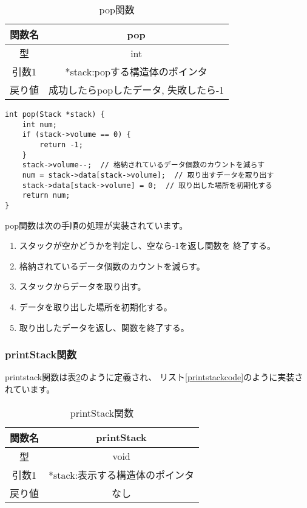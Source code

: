 \documentclass[a4j]{jarticle}
\begin{document}
\begin{table}[h]
  \centering
  \caption{pop関数}
  \label{tb:pop}
  \begin{tabular}{|c|c|}
    \hline
    関数名 & pop                    \\
    \hline
    型   & int                    \\
    \hline
    引数1 & *stack:popする構造体のポインタ   \\
    \hline
    戻り値 & 成功したらpopしたデータ, 失敗したら-1 \\
    \hline
  \end{tabular}
\end{table}

\begin{lstlisting}[caption=pop関数,label=popcode]
  int pop(Stack *stack) {
    int num;
    if (stack->volume == 0) {
        return -1;
    }
    stack->volume--;  // 格納されているデータ個数のカウントを減らす
    num = stack->data[stack->volume];  // 取り出すデータを取り出す
    stack->data[stack->volume] = 0;  // 取り出した場所を初期化する
    return num;
}
  \end{lstlisting}

pop関数は次の手順の処理が実装されています。
\begin{enumerate}
  \item スタックが空かどうかを判定し、空なら-1を返し関数を
        終了する。
  \item 格納されているデータ個数のカウントを減らす。
  \item スタックからデータを取り出す。
  \item データを取り出した場所を初期化する。
  \item 取り出したデータを返し、関数を終了する。
\end{enumerate}

\subsubsection{printStack関数}
\label{sec:printStack}
printstack関数は表\ref{tb:printstack}のように定義され、
リスト\ref{printstackcode}のように実装されています。

\begin{table}[h]
  \centering
  \caption{printStack関数}
  \label{tb:printstack}
  \begin{tabular}{|c|c|}
    \hline
    関数名 & printStack          \\
    \hline
    型   & void                \\
    \hline
    引数1 & *stack:表示する構造体のポインタ \\
    \hline
    戻り値 & なし                  \\
    \hline
  \end{tabular}
\end{table}
\end{document}
